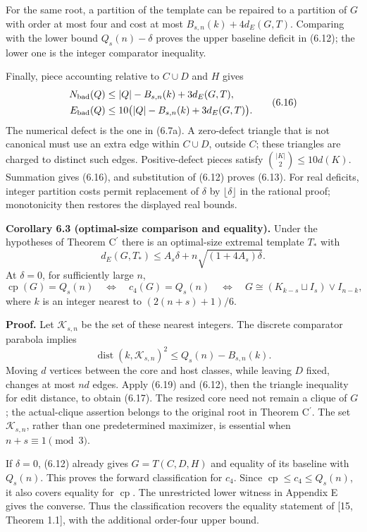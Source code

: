 \documentclass[english,11pt,a4paper]{article}
\begin{document}
For the same root, a partition of the template can be repaired to a partition of \(G\) with order at most four and cost at most \(B_{s,n}(k)+4d_E(G,T)\). Comparing with the lower bound \(Q_s(n)-\delta\) proves the upper baseline deficit in (6.12); the lower one is the integer comparator inequality.

Finally, piece accounting relative to \(C\cup D\) and \(H\) gives \[
\begin{aligned}
N_{\rm bad}(Q)&\le |Q|-B_{s,n}(k)+3d_E(G,T),\\
E_{\rm bad}(Q)&\le10\bigl(|Q|-B_{s,n}(k)+3d_E(G,T)\bigr).
\end{aligned}
\tag{6.16}
\] The numerical defect is the one in (6.7a). A zero-defect triangle that is not canonical must use an extra edge within \(C\cup D\), outside \(C\); these triangles are charged to distinct such edges. Positive-defect pieces satisfy \(\binom{|K|}{2}\le10d(K)\). Summation gives (6.16), and substitution of (6.12) proves (6.13). For real deficits, integer partition costs permit replacement of \(\delta\) by \(\lfloor\delta\rfloor\) in the rational proof; monotonicity then restores the displayed real bounds.


\textbf{Corollary 6.3 (optimal-size comparison and equality).} Under the hypotheses of Theorem \texorpdfstring{C\ensuremath{^{\prime}}}{C'} there is an optimal-size extremal template \(T_*\) with \[
d_E(G,T_*)\le A_s\delta+n\sqrt{(1+4A_s)\delta}.
\tag{6.17}
\] At \(\delta=0\), for sufficiently large \(n\), \[
\operatorname{cp}(G)=Q_s(n)
\quad\Longleftrightarrow\quad c_4(G)=Q_s(n)
\quad\Longleftrightarrow\quad
G\cong(K_{k-s}\sqcup I_s)\vee I_{n-k},
\tag{6.18}
\] where \(k\) is an integer nearest to \((2(n+s)+1)/6\).

\textbf{Proof.} Let \(\mathcal K_{s,n}\) be the set of these nearest integers. The discrete comparator parabola implies \[
\operatorname{dist}(k,\mathcal K_{s,n})^2
\le Q_s(n)-B_{s,n}(k).
\tag{6.19}
\] Moving \(d\) vertices between the core and host classes, while leaving \(D\) fixed, changes at most \(nd\) edges. Apply (6.19) and (6.12), then the triangle inequality for edit distance, to obtain (6.17). The resized core need not remain a clique of \(G\); the actual-clique assertion belongs to the original root in Theorem \texorpdfstring{C\ensuremath{^{\prime}}}{C'}. The set \(\mathcal K_{s,n}\), rather than one predetermined maximizer, is essential when \(n+s\equiv1\pmod3\).

If \(\delta=0\), (6.12) already gives \(G=T(C,D,H)\) and equality of its baseline with \(Q_s(n)\). This proves the forward classification for \(c_4\). Since \(\operatorname{cp}\le c_4\le Q_s(n)\), it also covers equality for \(\operatorname{cp}\). The unrestricted lower witness in Appendix E gives the converse. Thus the classification recovers the equality statement of {[}15, Theorem 1.1{]}, with the additional order-four upper bound.
\end{document}
